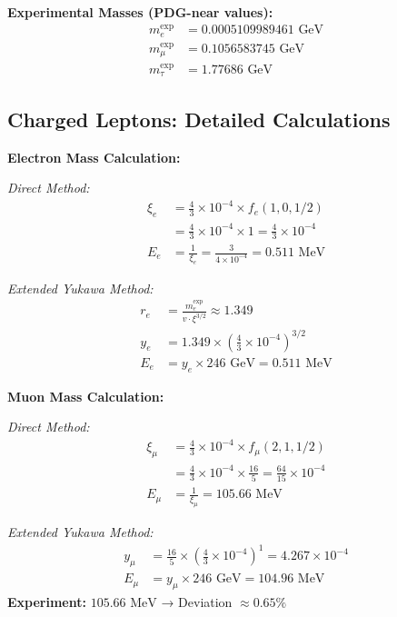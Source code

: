 	\textbf{Experimental Masses (PDG-near values):}
	\begin{align}
		m_e^{\text{exp}} &= 0.0005109989461 \text{ GeV} \\
		m_\mu^{\text{exp}} &= 0.1056583745 \text{ GeV} \\
		m_\tau^{\text{exp}} &= 1.77686 \text{ GeV}
	\end{align}
	
	\subsection{Charged Leptons: Detailed Calculations}
	\label{subsec:charged_leptons_detailed}
	
	\textbf{Electron Mass Calculation:}
	
	\textit{Direct Method:}
	\begin{align}
		\xi_e &= \frac{4}{3} \times 10^{-4} \times f_e(1,0,1/2) \\
		&= \frac{4}{3} \times 10^{-4} \times 1 = \frac{4}{3} \times 10^{-4} \\
		E_{e} &= \frac{1}{\xi_e} = \frac{3}{4 \times 10^{-4}} = 0.511 \text{ MeV}
	\end{align}
	
	\textit{Extended Yukawa Method:}
	\begin{align}
		r_e &= \frac{m_e^{\text{exp}}}{v \cdot \xi^{3/2}} \approx 1.349 \\
		y_e &= 1.349 \times \left(\frac{4}{3} \times 10^{-4}\right)^{3/2} \\
		E_e &= y_e \times 246 \text{ GeV} = 0.511 \text{ MeV}
	\end{align}
	
	\textbf{Muon Mass Calculation:}
	
	\textit{Direct Method:}
	\begin{align}
		\xi_\mu &= \frac{4}{3} \times 10^{-4} \times f_\mu(2,1,1/2) \\
		&= \frac{4}{3} \times 10^{-4} \times \frac{16}{5} = \frac{64}{15} \times 10^{-4} \\
		E_{\mu} &= \frac{1}{\xi_\mu} = 105.66 \text{ MeV}
	\end{align}
	
	\textit{Extended Yukawa Method:}
	\begin{align}
		y_\mu &= \frac{16}{5} \times \left(\frac{4}{3} \times 10^{-4}\right)^1 = 4.267 \times 10^{-4} \\
		E_\mu &= y_\mu \times 246 \text{ GeV} = 104.96 \text{ MeV}
	\end{align}
	\textbf{Experiment:} $105.66 \text{ MeV}$ → Deviation $\approx 0.65\%$
	

